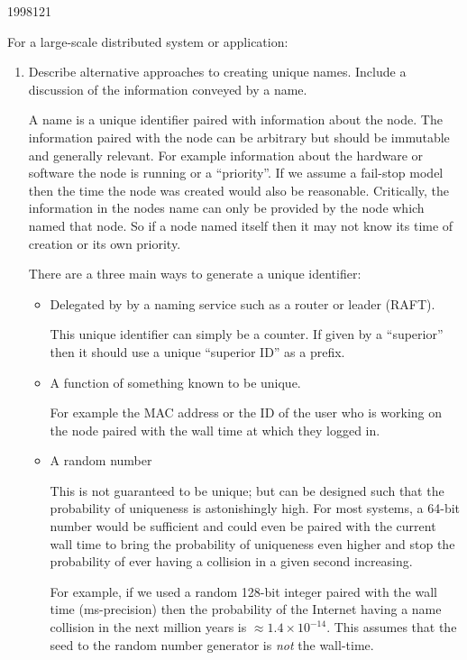 \documentclass[10pt,\jkfside,a4paper]{article}
\begin{document}
\begin{examquestion}{1998}{12}{1}

For a large-scale distributed system or application:

\begin{enumerate}[label=(\alph*)]

\item Describe alternative approaches to creating unique names. Include a
discussion of the information conveyed by a name.

A name is a unique identifier paired with information about the node.
The information paired with the node can be arbitrary but should
be immutable and generally relevant. For example information about the
hardware or software the node is running or a ``priority''. If we assume a
fail-stop model then the time the node was created would also be reasonable.
Critically, the information in the nodes name can only be provided by the
node which named that node. So if a node named itself then it may not know
its time of creation or its own priority.

There are a three main ways to generate a unique identifier:
\begin{itemize}

\item Delegated by by a naming service such as a router or leader (RAFT).

This unique identifier can simply be a counter. If given by a ``superior''
then it should use a unique ``superior ID'' as a prefix.

\item A function of something known to be unique.

For example the MAC address or the ID of the user who is working on the node
paired with the wall time at which they logged in.

\item A random number

This is not guaranteed to be unique; but can be designed such that the
probability of uniqueness is astonishingly high. For most systems, a 64-bit
number would be sufficient and could even be paired with the current wall
time to bring the probability of uniqueness even higher and stop the
probability of ever having a collision in a given second increasing.

For example, if we used a random 128-bit integer paired with the wall time
(ms-precision) then the probability of the Internet having a name collision
in the next million years is $\approx 1.4 \times 10^{-14}$. This assumes
that the seed to the random number generator is \textit{not} the wall-time.


\end{itemize}
\end{enumerate}
\end{examquestion}
\end{document}
